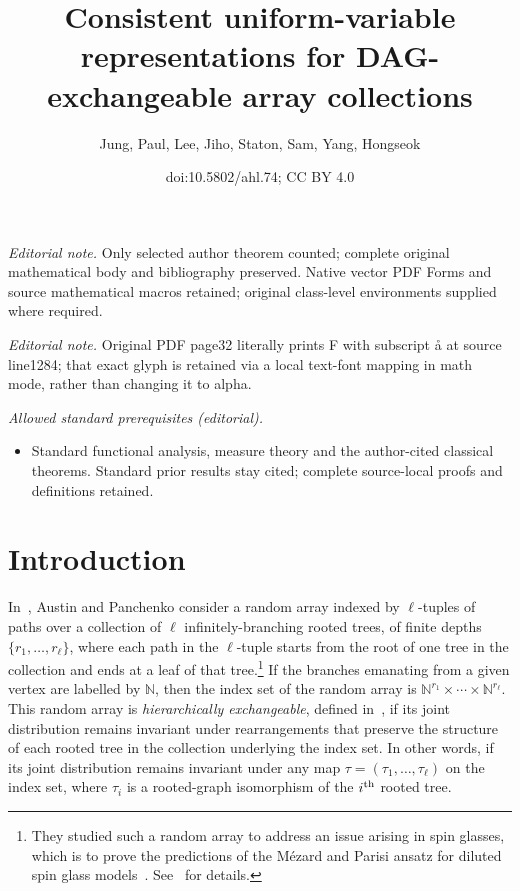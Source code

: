 \documentclass[10pt]{amsart}
\title{Consistent uniform-variable representations for DAG-exchangeable array collections}
\author{Jung, Paul, Lee, Jiho, Staton, Sam, Yang, Hongseok}
\date{doi:10.5802/ahl.74; CC BY 4.0}
\theoremstyle{definition}\newtheorem{defi}[theo]{Definition}\newtheorem{rema}[theo]{Remark}\newtheorem{exam}[theo]{Example}\newtheorem{exem}[theo]{Example}\newtheorem{nota}[theo]{Notation}
\newcommand*\N{\mathbb{N}}
\begin{document}
\maketitle
\noindent\textit{Editorial note.} Only selected author theorem counted; complete original mathematical body and bibliography preserved. Native vector PDF Forms and source mathematical macros retained; original class-level environments supplied where required.\par\medskip
\noindent\textit{Editorial note.} Original PDF page32 literally prints F with subscript å at source line1284; that exact glyph is retained via a local text-font mapping in math mode, rather than changing it to alpha.\par\medskip
\noindent\textit{Allowed standard prerequisites (editorial).}\begin{itemize}
\item Standard functional analysis, measure theory and the author-cited classical theorems. Standard prior results stay cited; complete source-local proofs and definitions retained.
\end{itemize}\medskip




\section{Introduction}

In~\cite{austin:panchenko:2014}, Austin and Panchenko consider a random array indexed by $\ell$-tuples of paths over a collection of $\ell$ infinitely-branching rooted trees, of finite depths $\{r_1,\ldots, r_\ell\}$, where each path in the $\ell$-tuple starts from the root of one tree in the collection and ends at a leaf of that tree.\footnote{They studied such a random array to address an issue arising in spin glasses, which is to prove the predictions of the Mézard and Parisi ansatz for diluted spin glass models~\cite{Mzard2001TheBL}. See~\cite{panchenko2015hierarchical} for details.} If the branches emanating from a given vertex are labelled by $\N$, then the index set of the random array is $\N^{r_1}\times\cdots\times\N^{r_\ell}$. This random array is \emph{hierarchically exchangeable}, defined in~\cite{austin:panchenko:2014}, if its joint distribution remains invariant under rearrangements that preserve the structure of each {rooted} tree in the collection underlying the index set. In other words, if its joint distribution remains invariant under any map $\tau=(\tau_1,\ldots,\tau_\ell)$ on the index set, where $\tau_i$ is a rooted-graph isomorphism of the $i^{\rm th}$ rooted tree.
\end{document}
